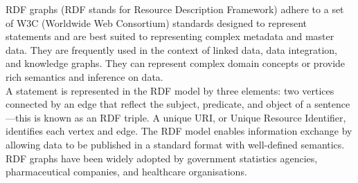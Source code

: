 \documentclass[12pt,a4paper]{article}
\begin{document}
RDF graphs (RDF stands for Resource Description Framework) adhere to a set of W3C (Worldwide Web Consortium) standards designed to represent statements and are best suited to representing complex metadata and master data. They are frequently used in the context of linked data, data integration, and knowledge graphs. They can represent complex domain concepts or provide rich semantics and inference on data.
\\
A statement is represented in the RDF model by three elements: two vertices connected by an edge that reflect the subject, predicate, and object of a sentence—this is known as an RDF triple. A unique URI, or Unique Resource Identifier, identifies each vertex and edge. The RDF model enables information exchange by allowing data to be published in a standard format with well-defined semantics. RDF graphs have been widely adopted by government statistics agencies, pharmaceutical companies, and healthcare organisations.

\pagebreak
\end{document}

